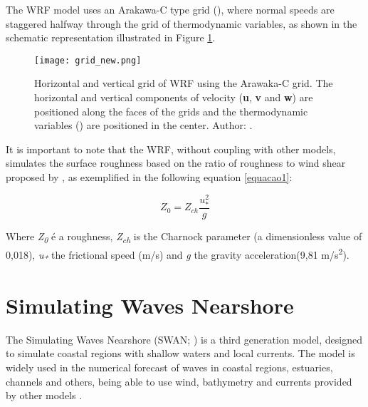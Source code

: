  The WRF model uses an Arakawa-C type grid (\cite{Arakawa1977}), where normal speeds are staggered halfway through the grid of thermodynamic variables, as shown in the 
schematic representation illustrated in Figure \textcolor{bleu_cite}{\ref{gradeswrf}}.
\bigskip

\begin{figure}[H]
    \centering
    \texttt{[image: grid\_new.png]}
    \caption{Horizontal and vertical grid of WRF using the Arawaka-C grid. The horizontal and vertical components
                        of velocity (\textbf{u}, \textbf{v} and \textbf{w}) are positioned along the faces of the grids and the thermodynamic variables
                        (\straighttheta) are positioned in the center. \newline Author: \textcite{Skamarock2008}.}
    \label{gradeswrf}
\end{figure}
\bigskip

 It is important to note that the WRF, without coupling with other models, simulates the surface roughness based on the ratio of roughness to wind 
shear proposed by \textcite{Charnock1955}, as exemplified in the following equation \textcolor{bleu_cite}{\ref{equacao1}}:
\bigskip

\begin{equation}
Z_{0} = Z_{ch} \frac{u_{*}^{2}}{g}
\label{equacao1}
\end{equation}

\bigskip

 Where \textit{Z\textsubscript{0}} é a roughness, \textit{Z\textsubscript{ch}} is the Charnock parameter (a dimensionless value of 0,018), \textit{u\textsubscript{*}} 
the frictional speed (m/s) and \textit{g} the gravity acceleration(9,81 m/s\textsuperscript{2}).
\bigskip



\section{Simulating Waves Nearshore}\label{swansecao}
\bigskip

 The Simulating Waves Nearshore (SWAN; \cite{Booij1999, Booij1996}) is a third generation model,
designed to simulate coastal regions with shallow waters and local currents. The model is widely used in the numerical forecast of waves in coastal regions, estuaries,  channels and 
others, being able to use wind, bathymetry and currents provided by other models \parencite{Booij1999, Booij1996}.
\bigskip


